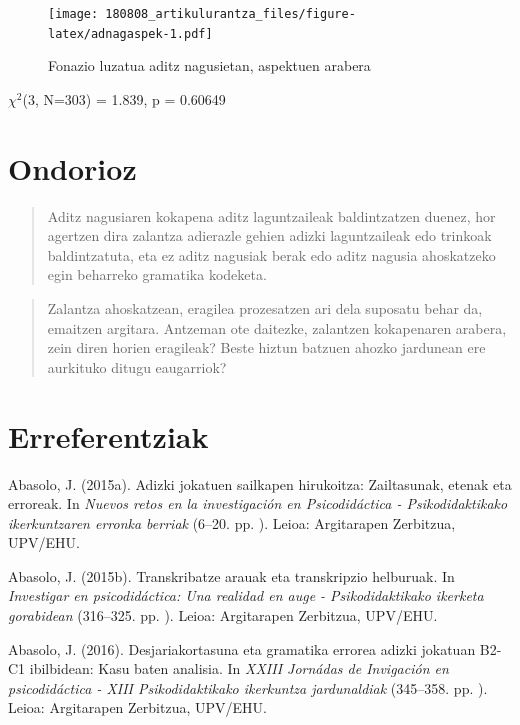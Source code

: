 \documentclass[]{article}
\begin{document}
\begin{figure}
\centering
\texttt{[image: 180808\_artikulurantza\_files/figure-latex/adnagaspek-1.pdf]}
\caption{Fonazio luzatua aditz nagusietan, aspektuen arabera}
\end{figure}

\(\chi^2\)(3, N=303) = 1.839, p = 0.60649

\section{Ondorioz}\label{ondorioz}

\begin{quote}
Aditz nagusiaren kokapena aditz laguntzaileak baldintzatzen duenez, hor
agertzen dira zalantza adierazle gehien adizki laguntzaileak edo
trinkoak baldintzatuta, eta ez aditz nagusiak berak edo aditz nagusia
ahoskatzeko egin beharreko gramatika kodeketa.
\end{quote}

\begin{quote}
Zalantza ahoskatzean, eragilea prozesatzen ari dela suposatu behar da,
emaitzen argitara. Antzeman ote daitezke, zalantzen kokapenaren arabera,
zein diren horien eragileak? Beste hiztun batzuen ahozko jardunean ere
aurkituko ditugu eaugarriok?
\end{quote}

\section*{Erreferentziak}\label{erreferentziak}

\hypertarget{refs}{}
\hypertarget{ref-abasolo_adizki_2015}{}
Abasolo, J. (2015a). Adizki jokatuen sailkapen hirukoitza: Zailtasunak,
etenak eta erroreak. In \emph{Nuevos retos en la investigación en
Psicodidáctica - Psikodidaktikako ikerkuntzaren erronka berriak} (6--20.
pp. ). Leioa: Argitarapen Zerbitzua, UPV/EHU.

\hypertarget{ref-abasolo_transkribatze_2015}{}
Abasolo, J. (2015b). Transkribatze arauak eta transkripzio helburuak. In
\emph{Investigar en psicodidáctica: Una realidad en auge -
Psikodidaktikako ikerketa gorabidean} (316--325. pp. ). Leioa:
Argitarapen Zerbitzua, UPV/EHU.

\hypertarget{ref-abasolo_desjariakortasuna_2016}{}
Abasolo, J. (2016). Desjariakortasuna eta gramatika errorea adizki
jokatuan B2-C1 ibilbidean: Kasu baten analisia. In \emph{XXIII Jornádas
de Invigación en psicodidáctica - XIII Psikodidaktikako ikerkuntza
jardunaldiak} (345--358. pp. ). Leioa: Argitarapen Zerbitzua, UPV/EHU.
\end{document}
